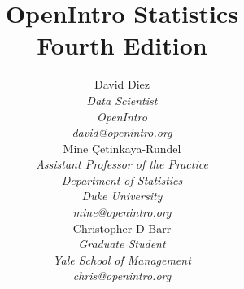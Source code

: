 
\title{\huge OpenIntro Statistics\vspace{1.5mm} \\ \Large Fourth Edition}
\author{David Diez \\
\small\emph{Data Scientist} \\
\small\emph{OpenIntro} \\
\vspace{6mm}%
\small\emph{david@openintro.org} \\
Mine \c{C}etinkaya-Rundel \\
\small\emph{Assistant Professor of the Practice} \\
\small\emph{Department of Statistics} \\
\small\emph{Duke University} \\
\vspace{6mm}%
\small\emph{mine@openintro.org} \\
Christopher D Barr \\
\small\emph{Graduate Student} \\
\small\emph{Yale School of Management} \\
\small\emph{chris@openintro.org}}
